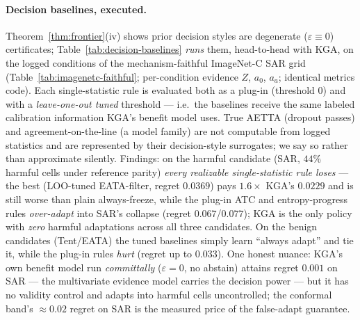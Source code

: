 \documentclass[conference]{IEEEtran}
\theoremstyle{plain}
\theoremstyle{definition}
\begin{document}
\paragraph{Decision baselines, executed.}
Theorem~\ref{thm:frontier}(iv) shows prior decision styles are
degenerate ($\varepsilon{\equiv}0$) certificates; Table~\ref{tab:decision-baselines}
\emph{runs} them, head-to-head with \textsc{KGA}, on the logged conditions of the
mechanism-faithful ImageNet-C SAR grid (Table~\ref{tab:imagenetc-faithful}; per-condition
evidence $Z$, $a_0$, $a_a$; identical metrics code). Each
single-statistic rule is evaluated both as a plug-in (threshold $0$) and with a
\emph{leave-one-out tuned} threshold --- i.e.\ the baselines receive the same labeled
calibration information \textsc{KGA}'s benefit model uses. True AETTA (dropout passes)
and agreement-on-the-line (a model family) are not computable from logged statistics
and are represented by their decision-style surrogates; we say so rather than
approximate silently. Findings: on the harmful candidate (SAR, $44\%$ harmful cells
under reference parity) \emph{every realizable single-statistic rule loses} --- the
best (LOO-tuned EATA-filter, regret $0.0369$) pays $1.6\times$ \textsc{KGA}'s $0.0229$
and is still worse than plain always-freeze, while the plug-in ATC and entropy-progress
rules \emph{over-adapt} into SAR's collapse (regret $0.067$/$0.077$); \textsc{KGA} is
the only policy with \emph{zero} harmful adaptations across all three candidates. On
the benign candidates (Tent/EATA) the tuned baselines simply learn ``always adapt''
and tie it, while the plug-in rules \emph{hurt} (regret up to $0.033$). One honest
nuance: \textsc{KGA}'s own benefit model run \emph{committally}
($\varepsilon{=}0$, no abstain) attains regret $0.001$ on SAR --- the multivariate
evidence model carries the decision power --- but it has no validity control and
adapts into harmful cells uncontrolled; the conformal band's $\approx0.02$
regret on SAR is the measured price of the false-adapt guarantee.
\end{document}
